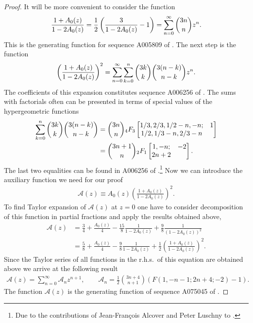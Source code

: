 \documentclass[pdftex]{sigma}
\numberwithin{equation}{section}
\begin{document}
\begin{proof}
It will be more convenient to consider the function
\begin{gather}\label{eq:series1standard}
\frac{1+A_0(z)}{1-2A_0(z)}=\frac12\left(\frac3{1-2A_0(z)}-1\right)=\sum\limits_{n=0}^{\infty}\dbinom{3n}{n}z^n.
\end{gather}
This is the generating function for sequence A005809 of \cite{OEIS}. The next step is the function
\begin{gather}\label{eq:series2standard}
\left(\frac{1+A_0(z)}{1-2A_0(z)}\right)^2=\sum\limits_{n=0}^{\infty}\sum\limits_{k=0}^{n}\dbinom{3k}{k}\dbinom{3(n-k)}{n-k}z^n.
\end{gather}
The coefficients of this expansion constitutes sequence A006256 of \cite{OEIS}. The sums with factorials often can be
presented in terms of special values of the hypergeometric functions
\begin{align*}
\sum\limits_{k=0}^{n}\dbinom{3k}{k}\dbinom{3(n-k)}{n-k}&=\dbinom{3n}{n}
{}_4F_3\begin{bmatrix}1/3, 2/3, 1/2-n, -n;&1\\ 1/2, 1/3-n, 2/3-n&\end{bmatrix}\\
&=\dbinom{3n+1}{n} {}_2F_1\begin{bmatrix}1,-n;&-2\\2n+2&\end{bmatrix}.
\end{align*}
The last two equalities can be found in A006256 of \cite{OEIS}.\footnote{Due to the contributions of
Jean-Fran\c cois Alcover and Peter Luschny to \cite{OEIS}.}
Now we can introduce the auxiliary function we need for our proof
\begin{gather*}%
\mathcal{A}(z)\equiv A_0(z)\left(\frac{1+A_0(z)}{1-2A_0(z)}\right)^2.
\end{gather*}
To find Taylor expansion of $\mathcal{A}(z)$ at $z=0$ one have to consider decomposition of this function
in partial fractions and apply the results obtained above,
\begin{align*}
\mathcal{A}(z)&=\frac34+\frac{A_0(z)}4-\frac{15}8\frac1{1-2A_0(z)}+\frac98\frac1{(1-2A_0(z))^2}\\
&=\frac58+\frac{A_0(z)}4-\frac98\frac1{1-2A_0(z)}+\frac12\left(\frac{1+A_0(z)}{1-2A_0(z)}\right)^2.
\end{align*}
Since the Taylor series of all functions in the r.h.s.\ of this equation are obtained above
we arrive at the following result
\begin{gather}\label{eq:mathcal-A-gauss}
\mathcal{A}(z)=\sum\limits_{n=0}^{\infty}\mathcal{A}_nz^{n+1},\qquad
\mathcal{A}_n=\frac12\binom{3n+4}{n+1}\left(F(1,-n-1;2n+4;-2)-1\right).
\end{gather}
The function $\mathcal{A}(z)$ is the generating function of sequence A075045 of \cite{OEIS}.


\end{proof}
\end{document}
